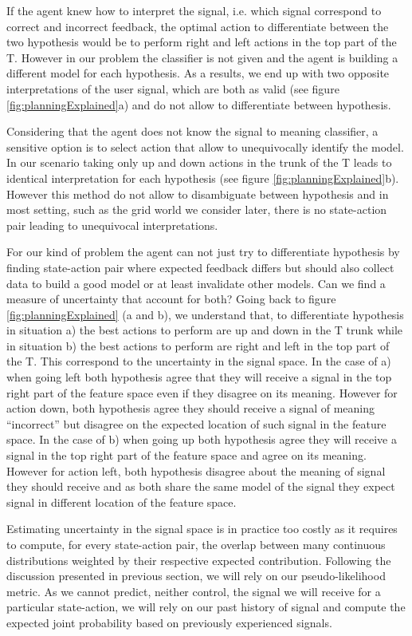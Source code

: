 If the agent knew how to interpret the signal, i.e. which signal correspond to correct and incorrect feedback, the optimal action to differentiate between the two hypothesis would be to perform right and left actions in the top part of the T. However in our problem the classifier is not given and the agent is building a different model for each hypothesis. As a results, we end up with two opposite interpretations of the user signal, which are both as valid (see figure \ref{fig:planningExplained}a) and do not allow to differentiate between hypothesis.

Considering that the agent does not know the signal to meaning classifier, a sensitive option is to select action that allow to unequivocally identify the model. In our scenario taking only up and down actions in the trunk of the T leads to identical interpretation for each hypothesis (see figure \ref{fig:planningExplained}b). However this method do not allow to disambiguate between hypothesis and in most setting, such as the grid world we consider later, there is no state-action pair leading to unequivocal interpretations.

For our kind of problem the agent can not just try to differentiate hypothesis by finding state-action pair where expected feedback differs but should also collect data to build a good model or at least invalidate other models. Can we find a measure of uncertainty that account for both? Going back to figure \ref{fig:planningExplained} (a and b), we understand that, to differentiate hypothesis in situation a) the best actions to perform are up and down in the T trunk while in situation b) the best actions to perform are right and left in the top part of the T. This correspond to the uncertainty in the signal space. In the case of a) when going left both hypothesis agree that they will receive a signal in the top right part of the feature space even if they disagree on its meaning. However for action down, both hypothesis agree they should receive a signal of meaning ``incorrect'' but disagree on the expected location of such signal in the feature space. In the case of b) when going up both hypothesis agree they will receive a signal in the top right part of the feature space and agree on its meaning. However for action left, both hypothesis disagree about the meaning of signal they should receive and as both share the same model of the signal they expect signal in different location of the feature space.

Estimating uncertainty in the signal space is in practice too costly as it requires to compute, for every state-action pair, the overlap between many continuous distributions weighted by their respective expected contribution. Following the discussion presented in previous section, we will rely on our pseudo-likelihood metric. As we cannot predict, neither control, the signal we will receive for a particular state-action, we will rely on our past history of signal and compute the expected joint probability based on previously experienced signals.

